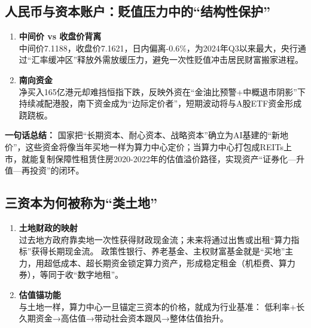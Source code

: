 \subsection{人民币与资本账户：贬值压力中的“结构性保护”}
\begin{enumerate}[leftmargin=*, nosep]
    \item \textbf{中间价 vs 收盘价背离}  \\
    中间价7.1188，收盘价7.1621，日内偏离-0.6\%，为2024年Q3以来最大，{\color{red}央行通过“汇率缓冲区”释放外需放缓压力，避免一次性贬值冲击居民财富搬家进程。}  
    \item \textbf{南向资金}  \\
    净买入165亿港元却难挡恒指下跌，反映外资在“金油比预警+中概退市阴影”下持续减配港股，南下资金成为“边际定价者”，短期波动将与A股ETF资金形成跷跷板。
\end{enumerate}

{}
\textbf{一句话总结：}  
国家把“长期资本、耐心资本、战略资本”确立为AI基建的“新地价”，这些资金将像当年买地一样为算力中心定价；当算力中心打包成REITs上市，就能复制保障性租赁住房2020-2022年的估值溢价路径，实现资产“证券化—升值—再投资”的闭环。

\subsection{三资本为何被称为“类土地”}
\begin{enumerate}[leftmargin=*, nosep]
    \item \textbf{土地财政的映射}  \\
    过去地方政府靠卖地一次性获得财政现金流；{\color{red}未来将通过出售或出租“算力指标”获得长期现金流。  
    政策性银行、养老基金、主权财富基金就是“买地”主力，用超低成本、超长期资金锁定算力资产，形成稳定租金（机柜费、算力券），等同于收“数字地租”。}
    \item \textbf{估值锚功能}  \\
    与土地一样，算力中心一旦锚定三资本的价格，就成为行业基准：  
    低利率+长久期资金→高估值→带动社会资本跟风→整体估值抬升。
\end{enumerate}

